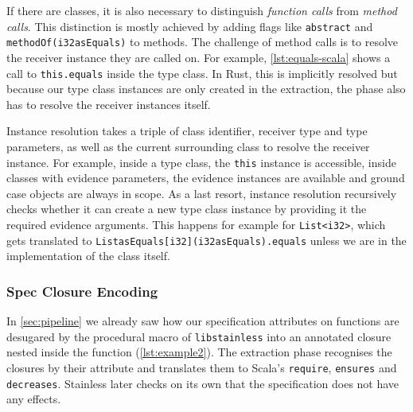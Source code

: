 If there are classes, it is also necessary to distinguish \emph{function
calls} from \emph{method calls}. This distinction is mostly achieved by
adding flags like \passthrough{\lstinline!abstract!} and
\passthrough{\lstinline!methodOf(i32asEquals)!} to methods. The
challenge of method calls is to resolve the receiver instance they are
called on. For example, \autoref{lst:equals-scala} shows a call to
\passthrough{\lstinline!this.equals!} inside the type class. In Rust,
this is implicitly resolved but because our type class instances are
only created in the extraction, the phase also has to resolve the
receiver instances itself.

Instance resolution takes a triple of class identifier, receiver type
and type parameters, as well as the current surrounding class to resolve
the receiver instance. For example, inside a type class, the
\passthrough{\lstinline!this!} instance is accessible, inside classes
with evidence parameters, the evidence instances are available and
ground case objects are always in scope. As a last resort, instance
resolution recursively checks whether it can create a new type class
instance by providing it the required evidence arguments. This happens
for example for \passthrough{\lstinline!List<i32>!}, which gets
translated to
\passthrough{\lstinline!ListasEquals[i32](i32asEquals).equals!} unless
we are in the implementation of the class itself.

\subsubsection{Spec Closure Encoding}

In \autoref{sec:pipeline} we already saw how our specification attributes
on functions are desugared by the procedural macro of
\passthrough{\lstinline!libstainless!} into an annotated closure nested
inside the function (\autoref{lst:example2}). The extraction phase
recognises the closures by their attribute and translates them to
Scala's \passthrough{\lstinline!require!},
\passthrough{\lstinline!ensures!} and
\passthrough{\lstinline!decreases!}. Stainless later checks on its own
that the specification does not have any effects.

